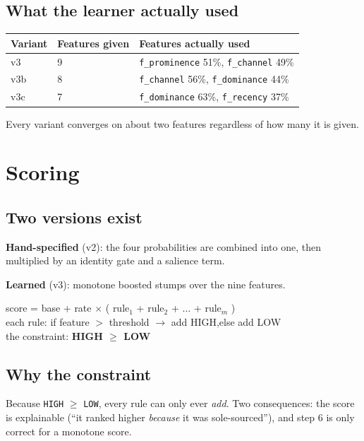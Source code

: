 \documentclass[11pt,a4paper]{article}
\begin{document}
\subsection*{What the learner actually used}
\begin{center}\small
\begin{tabular}{@{}lll@{}}
\toprule
\textbf{Variant} & \textbf{Features given} & \textbf{Features actually used} \\
\midrule
v3   & 9 & \texttt{f\_prominence} 51\%, \texttt{f\_channel} 49\% \\
v3b  & 8 & \texttt{f\_channel} 56\%, \texttt{f\_dominance} 44\% \\
v3c  & 7 & \texttt{f\_dominance} 63\%, \texttt{f\_recency} 37\% \\
\bottomrule
\end{tabular}
\end{center}
Every variant converges on about two features regardless of how many it is given.

\section{Scoring}

\subsection*{Two versions exist}

\textbf{Hand-specified} (v2): the four probabilities are combined into one, then
multiplied by an identity gate and a salience term.

\textbf{Learned} (v3): monotone boosted stumps over the nine features.
\begin{center}\ttfamily\small
score = base + rate $\times$ ( rule$_1$ + rule$_2$ + $\dots$ + rule$_m$ )\\[3pt]
each rule: \quad if feature $>$ threshold $\rightarrow$ add HIGH,\quad else add LOW\\[3pt]
the constraint: \quad \textbf{HIGH $\ge$ LOW}
\end{center}

\subsection*{Why the constraint}
Because \texttt{HIGH} $\ge$ \texttt{LOW}, every rule can only ever \emph{add}. Two
consequences: the score is explainable (``it ranked higher \emph{because} it was
sole-sourced''), and step 6 is only correct for a monotone score.
\end{document}
